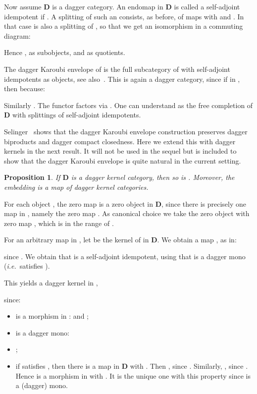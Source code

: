 \documentclass{article}
\newtheorem{proposition}[theorem]{Proposition}
\newenvironment{proof}[1][Proof]{ \begin{trivlist}\item[\hskip \labelsep {\bfseries #1}]}{ \end{trivlist}}
\newcommand{\QED}{\hspace*{\fill}}
\newcommand{\Cat}[1]{\ensuremath{\mathbf{#1}}}
\begin{document}
\smallskip

Now assume \Cat{D} is a dagger category. An endomap  in \Cat{D} is called a self-adjoint idempotent if
. A splitting of such an  consists, as
before, of maps  with  and .
In that case  is also a splitting of , so that
we get an isomorphism  in a commuting
diagram:


\noindent Hence , as subobjects, and  as
quotients.

The dagger Karoubi envelope  of  is the
full subcategory of  with self-adjoint idempotents
as objects, see also~\cite{Selinger08}. This is again a dagger
category, since if  in
, then 
because:


\noindent Similarly .  The functor
 factors via
. One can
understand  as the free completion of \Cat{D}
with splittings of self-adjoint idempotents.

Selinger~\cite{Selinger08} shows that the dagger Karoubi envelope
construction  preserves dagger biproducts and dagger
compact closedness. Here we extend this with dagger kernels in the
next result. It will not be used in the sequel but is included to show
that the dagger Karoubi envelope is quite natural in the current
setting.


\begin{proposition}
\label{KaroubiKernelProp}
If \Cat{D} is a dagger kernel category, then so is
. Moreover, the embedding  is a map of dagger kernel
categories.
\end{proposition}


\begin{proof}
For each object , the zero map 
is a zero object in \Cat{D}, since there is precisely one map
 in , namely the zero
map . As canonical choice we take the zero
object  with zero map , which is in the range of .

For an arbitrary map  in
, let  be the kernel
of  in \Cat{D}. We obtain a map , as in:


\noindent since . We obtain that
 is a self-adjoint idempotent, using that  is a dagger mono
(\textit{i.e.}~satisfies ).


\noindent This yields a dagger kernel in ,


\noindent since:
\begin{itemize}
\item  is a morphism in :  and ;

\item  is a dagger mono:


\item ;

\item if  satisfies ,
  then there is a map  in \Cat{D} with
  .  Then , since . Similarly, , since . Hence  is a morphism  in
   with . It is the unique one with this property since  is a
  (dagger) mono. \QED
\end{itemize}
\end{proof}
\end{document}
